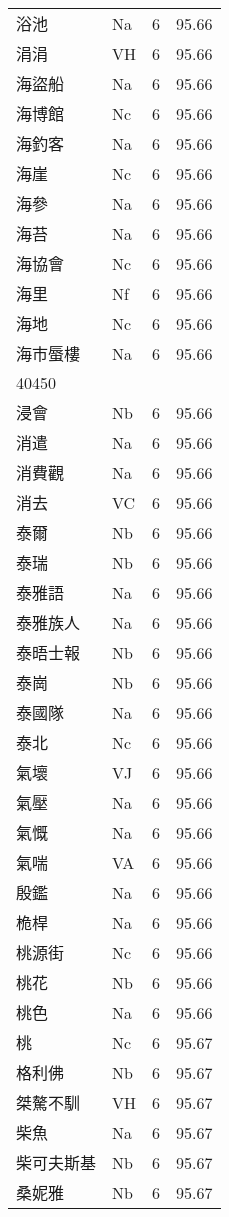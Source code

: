 \documentclass[twocolumn]{book}
\begin{document}
\begin{supertabular}{llrr}
浴池 & Na & 6 &  95.66\\
涓涓 & VH & 6 &  95.66\\
海盜船 & Na & 6 &  95.66\\
海博館 & Nc & 6 &  95.66\\
海釣客 & Na & 6 &  95.66\\
海崖 & Nc & 6 &  95.66\\
海參 & Na & 6 &  95.66\\
海苔 & Na & 6 &  95.66\\
海協會 & Nc & 6 &  95.66\\
海里 & Nf & 6 &  95.66\\
海地 & Nc & 6 &  95.66\\
海市蜃樓 & Na & 6 &  95.66\\
40450\\
浸會 & Nb & 6 &  95.66\\
消遣 & Na & 6 &  95.66\\
消費觀 & Na & 6 &  95.66\\
消去 & VC & 6 &  95.66\\
泰爾 & Nb & 6 &  95.66\\
泰瑞 & Nb & 6 &  95.66\\
泰雅語 & Na & 6 &  95.66\\
泰雅族人 & Na & 6 &  95.66\\
泰晤士報 & Nb & 6 &  95.66\\
泰崗 & Nb & 6 &  95.66\\
泰國隊 & Na & 6 &  95.66\\
泰北 & Nc & 6 &  95.66\\
氣壞 & VJ & 6 &  95.66\\
氣壓 & Na & 6 &  95.66\\
氣慨 & Na & 6 &  95.66\\
氣喘 & VA & 6 &  95.66\\
殷鑑 & Na & 6 &  95.66\\
桅桿 & Na & 6 &  95.66\\
桃源街 & Nc & 6 &  95.66\\
桃花 & Nb & 6 &  95.66\\
桃色 & Na & 6 &  95.66\\
桃 & Nc & 6 &  95.67\\
格利佛 & Nb & 6 &  95.67\\
桀驁不馴 & VH & 6 &  95.67\\
柴魚 & Na & 6 &  95.67\\
柴可夫斯基 & Nb & 6 &  95.67\\
桑妮雅 & Nb & 6 &  95.67\\

\end{supertabular}
\end{document}
